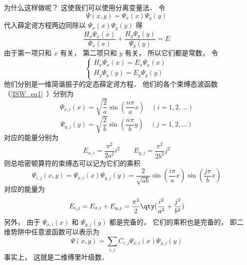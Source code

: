 为什么这样做呢？ 这使我们可以使用分离变量法． 令
\begin{equation}
\Psi(x, y) = \Psi_x(x)\Psi_y(y)
\end{equation}
代入薛定谔方程两边同除以 $\Psi_x(x)\Psi_y(y)$ 得
\begin{equation}
\frac{H_x \Psi_x(x)}{\Psi_x(x)} + \frac{H_y \Psi_y(y)}{\Psi_y(y)} = E
\end{equation}
由于第一项只和 $x$ 有关， 第二项只和 $y$ 有关， 所以它们都是常数， 令
\begin{equation}
\begin{cases}
H_x \Psi_x(x) = E_x \Psi_x(x)\\
H_y \Psi_y(y) = E_y \Psi_y(y)
\end{cases}
\end{equation}
他们分别是一维简谐振子的定态薛定谔方程． 他们的各个束缚态波函数（\autoref{ISW_eq1}~）分别为
\begin{equation}
\Psi_{x, i}(x) = \sqrt{\frac{2}{a}} \sin(\frac{n\pi}{a} x) \quad (i = 1,2,...)
\end{equation}
\begin{equation}
\Psi_{y, j}(y) = \sqrt{\frac{2}{b}} \sin(\frac{n\pi }{b} y) \quad (j = 1,2,...)
\end{equation}
对应的能量分别为
\begin{equation}
E_{x, i} = \frac{\pi^2}{2 a^2} i^2
\qquad
E_{y, j} = \frac{\pi^2}{2 b^2} j^2
\end{equation}
则总哈密顿算符的束缚态可以记为它们的乘积
\begin{equation}
\Psi_{i, j}(x, y) = \Psi_{x, i}(x) \Psi_{y, j}(y) = \frac{2}{\sqrt{ab}} \sin(\frac{i \pi}{a} x) \sin(\frac{j \pi}{b} x)
\end{equation}
对应的能量为
\begin{equation}
E_{i, j} = E_{x,i} + E_{y,j} = \frac{\pi^2}{2} \qty(\frac{i^2}{a^2} + \frac{j^2}{b^2})
\end{equation}
另外， 由于 $\Psi_{x, i}(x)$ 和 $\Psi_{y, j}(y)$ 都是完备的， 它们的乘积也是完备的， 即二维势阱中任意波函数可以表示为
\begin{equation}
\Psi(x, y) = \sum_{i,j} C_{i, j} \Psi_{x, i}(x) \Psi_{y, j}(y)
\end{equation}
事实上， 这就是二维傅里叶级数． %
